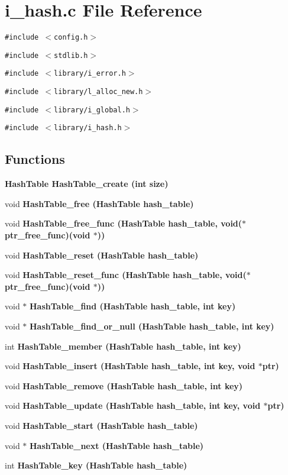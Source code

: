 \section{i\_\-hash.c File Reference}
\label{i__hash_8c}
{\tt \#include $<$config.h$>$}\par
{\tt \#include $<$stdlib.h$>$}\par
{\tt \#include $<$library/i\_\-error.h$>$}\par
{\tt \#include $<$library/l\_\-alloc\_\-new.h$>$}\par
{\tt \#include $<$library/i\_\-global.h$>$}\par
{\tt \#include $<$library/i\_\-hash.h$>$}\par
\subsection*{Functions}
\begin{CompactItemize}
\item 
\bf{Hash\-Table} \bf{Hash\-Table\_\-create} (int size)
\item 
void \bf{Hash\-Table\_\-free} (\bf{Hash\-Table} hash\_\-table)
\item 
void \bf{Hash\-Table\_\-free\_\-func} (\bf{Hash\-Table} hash\_\-table, void($\ast$ptr\_\-free\_\-func)(void $\ast$))
\item 
void \bf{Hash\-Table\_\-reset} (\bf{Hash\-Table} hash\_\-table)
\item 
void \bf{Hash\-Table\_\-reset\_\-func} (\bf{Hash\-Table} hash\_\-table, void($\ast$ptr\_\-free\_\-func)(void $\ast$))
\item 
void $\ast$ \bf{Hash\-Table\_\-find} (\bf{Hash\-Table} hash\_\-table, int key)
\item 
void $\ast$ \bf{Hash\-Table\_\-find\_\-or\_\-null} (\bf{Hash\-Table} hash\_\-table, int key)
\item 
int \bf{Hash\-Table\_\-member} (\bf{Hash\-Table} hash\_\-table, int key)
\item 
void \bf{Hash\-Table\_\-insert} (\bf{Hash\-Table} hash\_\-table, int key, void $\ast$ptr)
\item 
void \bf{Hash\-Table\_\-remove} (\bf{Hash\-Table} hash\_\-table, int key)
\item 
void \bf{Hash\-Table\_\-update} (\bf{Hash\-Table} hash\_\-table, int key, void $\ast$ptr)
\item 
void \bf{Hash\-Table\_\-start} (\bf{Hash\-Table} hash\_\-table)
\item 
void $\ast$ \bf{Hash\-Table\_\-next} (\bf{Hash\-Table} hash\_\-table)
\item 
int \bf{Hash\-Table\_\-key} (\bf{Hash\-Table} hash\_\-table)
\end{CompactItemize}

